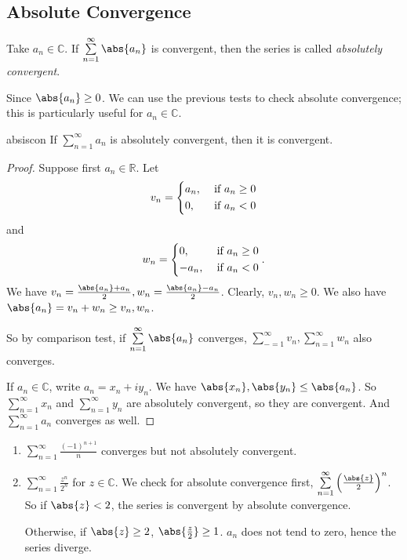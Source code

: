 \subsection{Absolute Convergence}
\begin{definition}{}{}
    Take \(a_n \in \mathbb{C}\). If \(\sum\limits_{n=1}^{\infty} \abs{a_n} \) is convergent, then the series is called \textit{absolutely convergent}.
\end{definition}
\begin{note}
    Since \(\abs{a_n} \geq 0\). We can use the previous tests to check absolute convergence; this is particularly useful for \(a_n \in \mathbb{C}\).
\end{note}
\begin{theorem}{}{absiscon}
    If \(\sum\limits_{n=1}^{\infty} a_n\) is absolutely convergent, then it is convergent.
\end{theorem}
\begin{proof}
    Suppose first \(a_n \in \mathbb{R}\). Let
    \[
        v_n = \begin{dcases}
            a_n, &\text{ if } a_n \geq 0\\
            0, &\text{ if }a_n < 0 \\
        \end{dcases}
    \]
    and
    \[
        w_n = \begin{dcases}
            0, &\text{ if } a_n \geq 0\\
            -a_n, &\text{ if }a_n < 0 \\
        \end{dcases}.
    \]
    We have \(v_n = \frac{\abs{a_n} +a_n}{2}, w_n = \frac{\abs{a_n} -a_n}{2}\). Clearly, \(v_n, w_n \geq 0\). We also have \(\abs{a_n} = v_n + w_n \geq v_n, w_n\).

    So by comparison test, if \(\sum\limits_{n=1}^{\infty} \abs{a_n} \) converges, \(\sum\limits_{-=1}^{\infty} v_n, \sum\limits_{n=1}^{\infty} w_n\) also converges.

    If \(a_n \in \mathbb{C}\), write \(a_n = x_n + iy_n\). We have \(\abs{x_n}, \abs{y_n} \leq \abs{a_n} \). So \(\sum\limits_{n=1}^{\infty} x_n\) and \(\sum\limits_{n=1}^{\infty} y_n\) are absolutely convergent, so they are convergent. And \(\sum\limits_{n=1}^{\infty} a_n\) converges as well.
\end{proof}
\begin{example}
    \leavevmode
    \begin{enumerate}
        \item \(\sum\limits_{n=1}^{\infty} \frac{(-1)^{n+1}}{n}\) converges but not absolutely convergent.
        \item \(\sum\limits_{n=1}^{\infty} \frac{z^n}{2^n}\) for \(z \in \mathbb{C}\). We check for absolute convergence first, \(\sum\limits_{n=1}^{\infty} \left(\frac{\abs{z}}{2}\right)^n\). So if \(\abs{z} < 2\), the series is convergent by absolute convergence.

        Otherwise, if \(\abs{z} \geq 2\), \(\abs{\frac{z}{2}} \geq 1\). \(a_n\) does not tend to zero, hence the series diverge.
    \end{enumerate}
\end{example}
